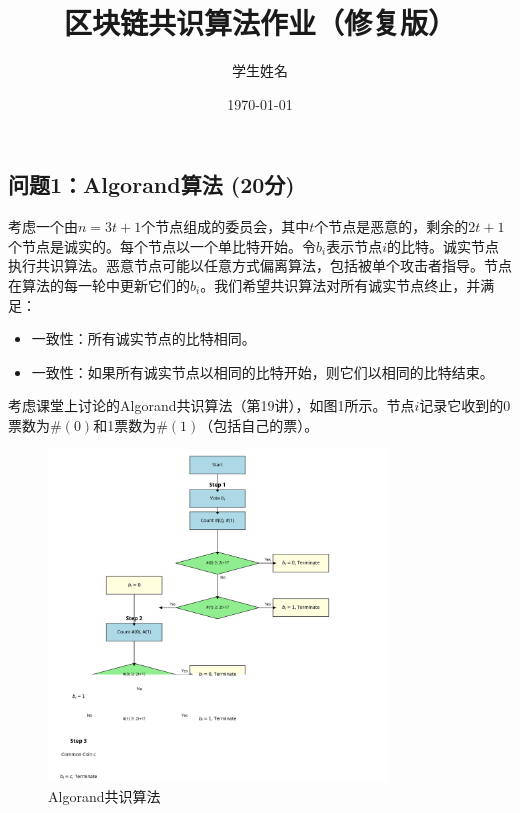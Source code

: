 \documentclass[12pt,a4paper]{article}
\title{区块链共识算法作业（修复版）}
\author{学生姓名}
\date{\today}
\begin{document}
\begin{CJK}{UTF8}{gbsn}

\maketitle

\section{问题1：Algorand算法 (20分)}

考虑一个由$n = 3t + 1$个节点组成的委员会，其中$t$个节点是恶意的，剩余的$2t + 1$个节点是诚实的。每个节点以一个单比特开始。令$b_i$表示节点$i$的比特。诚实节点执行共识算法。恶意节点可能以任意方式偏离算法，包括被单个攻击者指导。节点在算法的每一轮中更新它们的$b_i$。我们希望共识算法对所有诚实节点终止，并满足：

\begin{itemize}
    \item 一致性：所有诚实节点的比特相同。
    \item 一致性：如果所有诚实节点以相同的比特开始，则它们以相同的比特结束。
\end{itemize}

考虑课堂上讨论的Algorand共识算法（第19讲），如图1所示。节点$i$记录它收到的0票数为$\#(0)$和1票数为$\#(1)$（包括自己的票）。

\begin{figure}[h]
    \centering
    \includegraphics[width=0.8\textwidth]{images/algorand_algorithm_fixed.png}
    \caption{Algorand共识算法}
\end{figure}


\end{CJK}
\end{document}
